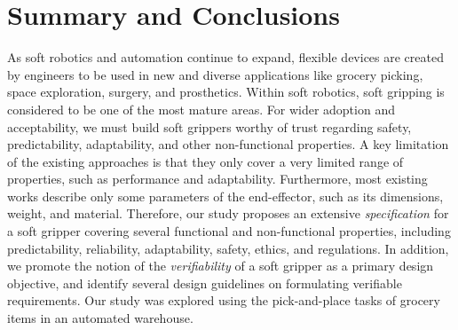 \documentclass[lettersize,journal]{IEEEtran}
\begin{document}
\section{Summary and Conclusions} \label{summary-conclusions}
As soft robotics and automation continue to expand, flexible devices are created by engineers to be used in new and diverse applications like grocery picking, space exploration, surgery, and prosthetics. 
Within soft robotics, soft gripping is considered to be one of the most mature areas. 
For wider adoption and acceptability, we must build soft grippers worthy of trust regarding safety, predictability, adaptability, and other non-functional properties. 
A key limitation of the existing approaches is that they only cover a very limited range of properties, such as performance and adaptability.  
Furthermore, most existing works describe only some parameters of the end-effector, such as its dimensions, weight, and material. 
Therefore, our study proposes an extensive \emph{specification} for a soft gripper covering several functional and non-functional properties, including predictability, reliability, adaptability, safety, ethics, and regulations. 
In addition, we promote the notion of the \emph{verifiability} of a soft gripper as a primary design objective, and identify several design guidelines on formulating verifiable requirements. 
Our study was explored using the pick-and-place tasks of grocery items in an automated warehouse.
\end{document}
